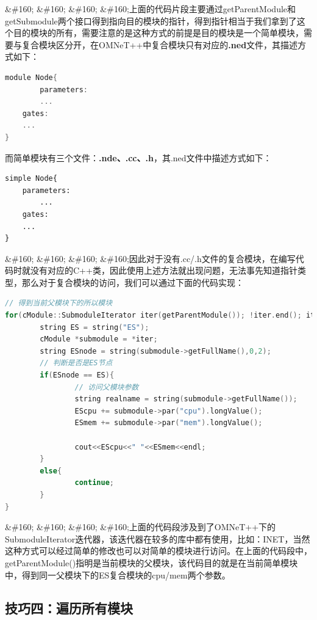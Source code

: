 \&\#160; \&\#160; \&\#160; \&\#160;上面的代码片段主要通过getParentModule和getSubmodule两个接口得到指向目的模块的指针，得到指针相当于我们拿到了这个目的模块的所有，需要注意的是这种方式的前提是目的模块是一个简单模块，需要与复合模块区分开，在OMNeT++中复合模块只有对应的\textbf{.ned}文件，其描述方式如下：

\begin{lstlisting}[language=c]
module Node{
        parameters:
    	...
	gates:
	...
}
\end{lstlisting}

而简单模块有三个文件：\textbf{.nde、.cc、.h}，其.ned文件中描述方式如下：

\begin{verbatim}
simple Node{
	parameters:
    	...
	gates:
	...
}
\end{verbatim}

\&\#160; \&\#160; \&\#160; \&\#160;因此对于没有.cc\slash .h文件的复合模块，在编写代码时就没有对应的C++类，因此使用上述方法就出现问题，无法事先知道指针类型，那么对于复合模块的访问，我们可以通过下面的代码实现：

\begin{lstlisting}[language=c]
// 得到当前父模块下的所以模块
for(cModule::SubmoduleIterator iter(getParentModule()); !iter.end(); iter++){
        string ES = string("ES");
        cModule *submodule = *iter;
        string ESnode = string(submodule->getFullName(),0,2);
        // 判断是否是ES节点
        if(ESnode == ES){
                // 访问父模块参数
                string realname = string(submodule->getFullName());
                EScpu += submodule->par("cpu").longValue();
                ESmem += submodule->par("mem").longValue();

                cout<<EScpu<<" "<<ESmem<<endl;
        }
        else{
                continue;
        }
}
\end{lstlisting}

\&\#160; \&\#160; \&\#160; \&\#160;上面的代码段涉及到了OMNeT++下的SubmoduleIterator迭代器，该迭代器在较多的库中都有使用，比如：INET，当然这种方式可以经过简单的修改也可以对简单的模块进行访问。在上面的代码段中，getParentModule()指明是当前模块的父模块，该代码目的就是在当前简单模块中，得到同一父模块下的ES复合模块的cpu\slash mem两个参数。

\subsection{技巧四：遍历所有模块}
\label{技巧四：遍历所有模块}

